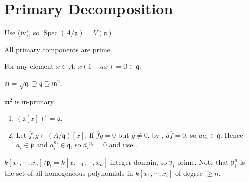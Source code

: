 \section{Primary Decomposition}

\begin{exercise}\label{ex4.1}
	Use \hyperref[ex1.21]{(iv)}, so $\operatorname{Spec}(A/\mathfrak{a})=V(\mathfrak{a})$.
\end{exercise}

\begin{exercise}\label{ex4.2}
	All primary components are prime.
\end{exercise}

\begin{exercise}\label{ex4.3}
	For any element $x\in A$, $x(1-ax)=0\in\mathfrak{q}$.
\end{exercise}

\begin{exercise}\label{ex4.4}
	$\mathfrak{m}=\sqrt{\mathfrak{q}}\supsetneq\mathfrak{q}\supsetneq\mathfrak{m}^2$.
\end{exercise}

\begin{exercise}\label{ex4.5}
	$\mathfrak{m}^2$ is $\mathfrak{m}$-primary.
\end{exercise}

\begin{exercise}\label{ex4.6}
	
\end{exercise}

\begin{exercise}\label{ex4.7}
	\begin{enumerate}
		\item[(ii),(iv),(v)] $(\mathfrak{a}[x])^c=\mathfrak{a}$.
		\item[(iii)] Let $\overline{f},\overline{g}\in\left(A/\mathfrak{q}\right)[x]$. If $\overline{f}\overline{g}=0$ but $\overline{g}\neq0$, by , $\overline{a}\overline{f}=0$, so $aa_i\in\mathfrak{q}$. Hence $a_i\in\mathfrak{p}$ and $a_i^{n_i}\in\mathfrak{q}$, so $\overline{a_i}^{n_i}=0$ and use .
	\end{enumerate}
\end{exercise}

\begin{exercise}\label{ex4.8}
	$k\left[x_1,\cdots,x_n\right]/\mathfrak{p_i}=k\left[x_{i+1},\cdots,x_n\right]$ integer domain, so $\mathfrak{p}_i$ prime. Note that $\mathfrak{p}_i^n$ is the set of all homogeneous polynomials in $k\left[x_1,\cdots,x_i\right]$ of degree $\geqslant n$.
\end{exercise}

